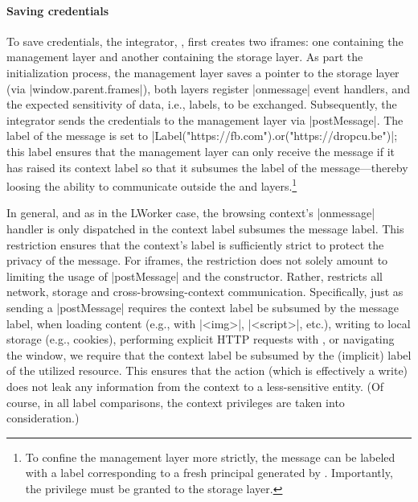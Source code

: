 \paragraph{Saving credentials}
%
To save credentials, the integrator, , first creates two
iframes: one containing the  management layer and
another containing the  storage layer.
%
As part the initialization process, the management layer saves a
pointer to the storage layer (via \js|window.parent.frames|), both
layers register \js|onmessage| event handlers, and the expected
sensitivity of data, i.e., labels, to be exchanged.
%
Subsequently, the integrator sends the credentials to the management
layer via \js|postMessage|.
%
The label of the message is set to
\js|Label("https://fb.com").or("https://dropcu.be")|; this label ensures that
the management layer can only receive the message if it has raised its context
label so that it subsumes the label of the message---thereby loosing the ability to
communicate outside the  and  layers.\footnote{
  To confine the management layer more strictly, the message can be labeled with
  a label corresponding to a fresh principal generated by
  . Importantly, the privilege must be granted to the storage
  layer.  }

In general, and as in the LWorker case, the browsing context's
\js|onmessage| handler is only dispatched in the context label
subsumes the message label.
%
This restriction ensures that the context's label is sufficiently strict to
protect the privacy of the message.
%
For iframes, the restriction does not solely amount to limiting the usage of
\js|postMessage| and the \xhr{} constructor.
%
Rather, \sys{} restricts all network, storage and
cross-browsing-context communication.
%
Specifically, just as sending a \js|postMessage| requires the context
label be subsumed by the message label, when loading content (e.g.,
with \js|<img>|, \js|<script>|, etc.), writing to local storage
(e.g., cookies), performing explicit HTTP requests with \xhr{}, or
navigating the window, we require that the context label be subsumed
by the (implicit) label of the utilized resource.
%
This ensures that the action (which is effectively a write) does not
leak any information from the context to a less-sensitive entity.
%
(Of course, in all label comparisons, the context privileges are taken
into consideration.)
%
 
